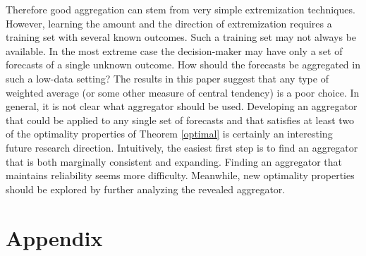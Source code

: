 \documentclass[11pt]{article}
\theoremstyle{definition}
\theoremstyle{definition}
\begin{document}
Therefore good aggregation can stem from very simple extremization techniques. However, learning the amount and the direction of extremization requires a training set with several known outcomes. Such a training set may not always be available. In the most extreme case  the decision-maker may have only a set of forecasts of a single unknown outcome. How should the forecasts be aggregated in such a low-data setting? The results in this paper suggest that any type of weighted average (or some other measure of central tendency) is a poor choice. In general, it is not clear what aggregator should be used. Developing an aggregator that could be applied to any single set of forecasts and that satisfies at least two of the optimality properties of Theorem \ref{optimal} is certainly an interesting future research direction. Intuitively, the easiest first step is to find an aggregator that is both marginally consistent and expanding. Finding an aggregator that maintains reliability seems more difficulty. Meanwhile, new optimality properties should be explored by further analyzing the revealed aggregator. 

%




%

%

\section{Appendix}
\end{document}
